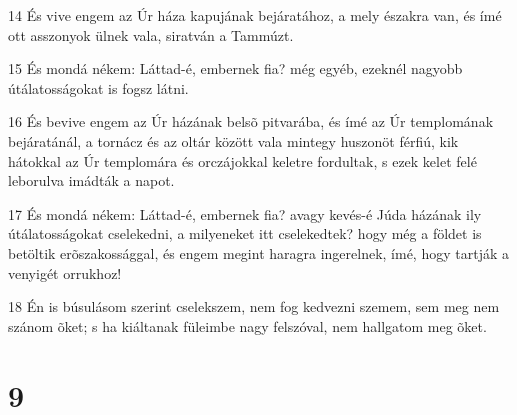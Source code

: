 \par 14 És vive engem az Úr háza kapujának bejáratához, a mely északra van, és ímé ott asszonyok ülnek vala, siratván a Tammúzt.
\par 15 És mondá nékem: Láttad-é, embernek fia? még egyéb, ezeknél nagyobb útálatosságokat is fogsz látni.
\par 16 És bevive engem az Úr házának belsõ pitvarába, és ímé az Úr templomának bejáratánál, a tornácz és az oltár között vala mintegy huszonöt férfiú, kik hátokkal az Úr templomára és orczájokkal keletre fordultak, s ezek kelet felé leborulva imádták a napot.
\par 17 És mondá nékem: Láttad-é, embernek fia? avagy kevés-é Júda házának ily útálatosságokat cselekedni, a milyeneket itt cselekedtek? hogy még a földet is betöltik erõszakossággal, és engem megint haragra ingerelnek, ímé, hogy tartják a venyigét orrukhoz!
\par 18 Én is búsulásom szerint cselekszem, nem fog kedvezni szemem, sem meg nem szánom õket; s ha kiáltanak füleimbe nagy felszóval, nem hallgatom meg  õket.

\chapter{9}

